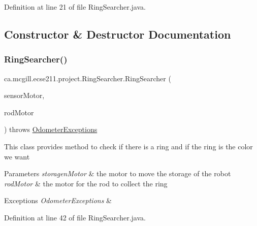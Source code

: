 Definition at line 21 of file Ring\+Searcher.\+java.



\subsection{Constructor \& Destructor Documentation}
\mbox{\label{classca_1_1mcgill_1_1ecse211_1_1project_1_1_ring_searcher_a37eebb6cbdfd692e0979c3ca0fe2597b}} 
\subsubsection{\texorpdfstring{Ring\+Searcher()}{RingSearcher()}}
{\footnotesize\ttfamily ca.\+mcgill.\+ecse211.\+project.\+Ring\+Searcher.\+Ring\+Searcher (\begin{DoxyParamCaption}\item[{E\+V3\+Large\+Regulated\+Motor}]{sensor\+Motor,  }\item[{E\+V3\+Large\+Regulated\+Motor}]{rod\+Motor }\end{DoxyParamCaption}) throws \hyperlink{classca_1_1mcgill_1_1ecse211_1_1odometer_1_1_odometer_exceptions}{Odometer\+Exceptions}}

This class provides method to check if there is a ring and if the ring is the color we want


\begin{DoxyParams}{Parameters}
{\em storagen\+Motor} & the motor to move the storage of the robot \\
\hline
{\em rod\+Motor} & the motor for the rod to collect the ring \\
\hline
\end{DoxyParams}

\begin{DoxyExceptions}{Exceptions}
{\em Odometer\+Exceptions} & \\
\hline
\end{DoxyExceptions}


Definition at line 42 of file Ring\+Searcher.\+java.



